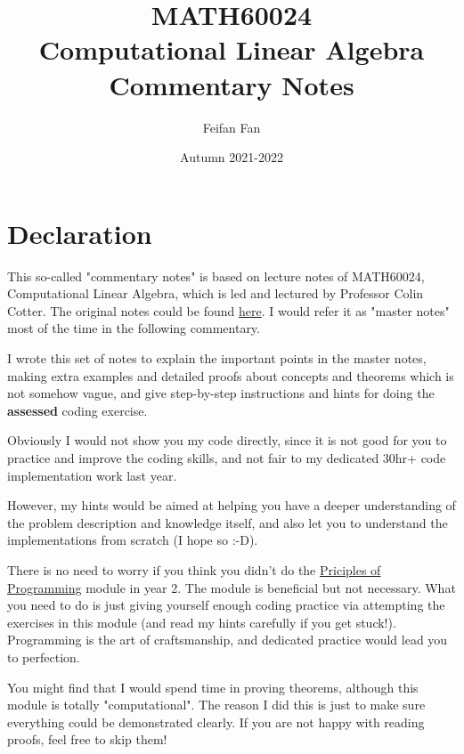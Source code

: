 \documentclass[a4paper,11pt,twoside]{report}
\begin{document}
\title{MATH60024 \\ Computational Linear Algebra \\
Commentary Notes}
\date{Autumn 2021-2022}
\author{Feifan Fan}




\maketitle
\chapter*{Declaration}
This so-called "commentary notes" is based on lecture notes of MATH60024, Computational Linear Algebra, which is led and lectured by Professor Colin Cotter. 
The original notes could be found \href{https://comp-lin-alg.github.io}{here}. I would refer it as "master notes" most of the time in the following commentary.

I wrote this set of notes to explain the important points in the master notes, making extra examples and detailed proofs about concepts and theorems which is not somehow vague, and give step-by-step instructions and hints for doing the \textbf{assessed} coding exercise.

Obviously I would not show you my code directly, since it is not good for you to practice and improve the coding skills, and not fair to my dedicated 30hr+ code implementation work last year.

However, my hints would be aimed at helping you have a deeper understanding of the problem description and knowledge itself, and also let you to understand the implementations from scratch (I hope so :-D).

There is no need to worry if you think you didn't do the \href{https://object-oriented-python.github.io}{Priciples of Programming} module in year 2. The module is beneficial but not necessary. What you need to do is just giving yourself enough coding practice via attempting the exercises in this module (and read my hints carefully if you get stuck!). Programming is the art of craftsmanship, and dedicated practice would lead you to perfection.


You might find that I would spend time in proving theorems, although this module is totally "computational". The reason I did this is just to make sure everything could be demonstrated clearly. If you are not happy with reading proofs, feel free to skip them!
\end{document}
